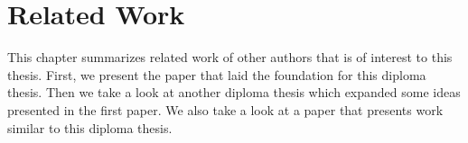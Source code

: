\chapter{Related Work}
\label{related}

This chapter summarizes related work of other authors that is of interest to this thesis.
First, we present the paper that laid the foundation for this diploma thesis.
Then we take a look at another diploma thesis which expanded some ideas presented in the first paper.
We also take a look at a paper that presents work similar to this diploma thesis.




